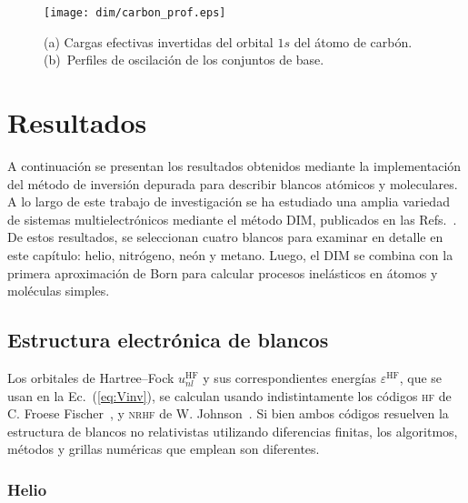\begin{figure}[t]
\centering
\texttt{[image: dim/carbon\_prof.eps]}
\caption[Inversión de orbitales descriptos con conjuntos de base 
finitos.]
{(a) Cargas efectivas invertidas del orbital $1s$ del átomo de carbón.
(b)~Perfiles de oscilación de los conjuntos de base.}
\label{fig:1sCarbon}
\end{figure}

\section{Resultados}
\label{sec:dimresultados}

A continuación se presentan los resultados obtenidos mediante la 
implementación del método de inversión depurada para describir blancos
atómicos y moleculares. A lo largo de este trabajo de investigación se 
ha estudiado una amplia variedad de sistemas multielectrónicos mediante 
el método DIM, publicados en las Refs.~\cite{Mendez:16,Mendez:19dim,
Mendez:18}. De estos resultados, se seleccionan cuatro blancos para 
examinar en detalle en este capítulo: helio, nitrógeno, neón y metano. 
Luego, el DIM se combina con la primera aproximación de Born para 
calcular procesos inelásticos en átomos y moléculas simples. 

\subsection{Estructura electrónica de blancos}
\label{subsec:dimtarget}

Los orbitales de Hartree--Fock $u_{nl}^{\mathrm{HF}}$ y sus 
correspondientes energías $\varepsilon^{\mathrm{HF}}$, que se 
usan en la Ec.~(\ref{eq:Vinv}), se calculan usando indistintamente los 
códigos \textsc{hf} de C. Froese Fischer~\cite{FroeseFischer:97}, y 
\textsc{nrhf} de W. Johnson~\cite{Johnson:07}. Si bien ambos códigos 
resuelven la estructura de blancos no relativistas utilizando 
diferencias finitas, los algoritmos, métodos y grillas numéricas 
que emplean son diferentes. 

\subsubsection{Helio}

